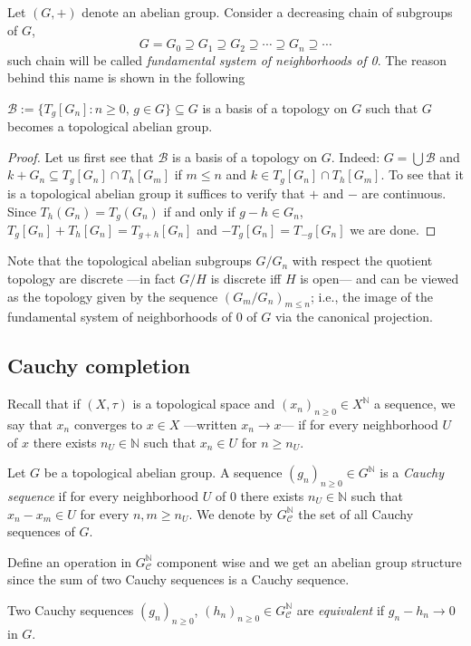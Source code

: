 Let $(G,+)$ denote an abelian group. Consider a decreasing chain of subgroups of $G$,
\[
G=G_0\supseteq G_1\supseteq G_2\supseteq \cdots \supseteq G_n\supseteq \cdots
\]
such chain will be called \emph{fundamental system of neighborhoods of 0}. The reason behind this name is shown in the following 
\begin{thm}
    $\mathcal B:= \{T_g\left[G_n\right]: n\geq 0, \, g\in G\}\subseteq G$ is a basis of a topology on $G$ such that $G$ becomes a topological abelian group.
\end{thm}
\begin{proof}
    Let us first see that $\mathcal B$ is a basis of a topology on $G$. Indeed: $G=\bigcup\mathcal B$ and $k+G_n\subseteq T_g[G_n]\cap T_h[G_m]$ if $m\leq n$ and $k\in T_g[G_n]\cap T_h[G_m]$. To see that it is a topological abelian group it suffices to verify that $+$ and $-$ are continuous. Since $T_h(G_n)=T_g(G_n)$ if and only if $g-h\in G_n$, $T_g[G_n]+T_h[G_n]=T_{g+h}[G_n]$ and $-T_g[G_n]=T_{-g}[G_n]$ we are done.
\end{proof}

Note that the topological abelian subgroups $G/G_n$ with respect the quotient topology are discrete ---in fact $G/H$ is discrete iff $H$ is open--- and can be viewed as the topology given by the sequence $(G_m/G_n)_{m\leq n}$; i.e., the image of the fundamental system of neighborhoods of $0$ of $G$ via the canonical projection.

\subsection{Cauchy completion}

Recall that if $(X,\tau)$ is a topological space and $(x_n)_{n\geq 0}\in X^\mathbb N$ a sequence, we say that $x_n$ converges to $x\in X$ ---written $x_n\to x$--- if for every neighborhood $U$ of $x$ there exists $n_U\in\mathbb N$ such that $x_n\in U$ for $n\geq n_U$.
\begin{defi}
    Let $G$ be a topological abelian group. A sequence $(g_n)_{n\geq 0}\in G^\mathbb N$ is a \emph{Cauchy sequence} if for every neighborhood $U$ of 0 there exists $n_U\in\mathbb N$ such that $x_n-x_m\in U$ for every $n,m\geq n_U$. We denote by $G^\mathbb N_{\mathcal C}$ the set of all Cauchy sequences of $G$.
\end{defi}

Define an operation in $G^\mathbb N_\mathcal C$ component wise and we get an abelian group structure since the sum of two Cauchy sequences is a Cauchy sequence. 
\begin{defi}
    Two Cauchy sequences $(g_n)_{n\geq 0}$, $(h_n)_{n\geq 0}\in G^\mathbb N_\mathcal C$ are \emph{equivalent} if $g_n-h_n\to 0$ in $G$.
\end{defi}

